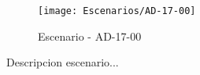 \begin{figure}[H]
\centering
\texttt{[image: Escenarios/AD-17-00]}
\caption{Escenario - AD-17-00}
\label{fig:AD-17-00}
\end{figure}

Descripcion escenario...
\clearpage
